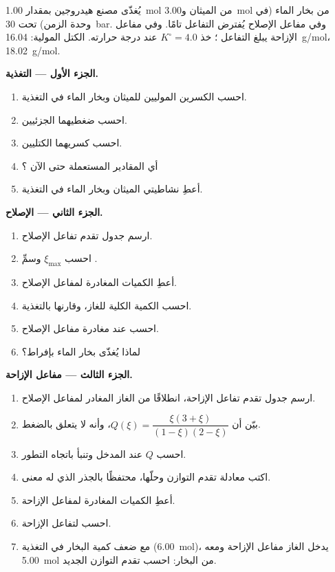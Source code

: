 \begin{problem}
\label{pb:b1:extent-q-and-k:1}
يُغذّى مصنع هيدروجين بمقدار \qty{1.00}{mol} من الميثان
و\qty{3.00}{mol} من بخار الماء (في وحدة الزمن) تحت \qty{30}{bar}. وفي
مفاعل الإصلاح يُفترض التفاعل  تامًا. وفي مفاعل
الإزاحة يبلغ التفاعل  ؛ خذ $K^\circ =
4.0$ عند درجة حرارته. الكتل المولية:  \qty{16.04}{g/mol}،
 \qty{18.02}{g/mol}.

\medskip
\noindent\textbf{الجزء الأول --- التغذية.}
\begin{enumerate}
  \item احسب الكسرين الموليين للميثان وبخار الماء في التغذية.
  \item احسب ضغطيهما الجزئيين.
  \item احسب كسريهما الكتليين.
  \item أي المقادير المستعملة حتى الآن ؟
  \item أعطِ نشاطيتي الميثان وبخار الماء في التغذية.
\end{enumerate}

\medskip
\noindent\textbf{الجزء الثاني --- الإصلاح.}
\begin{enumerate}[resume]
  \item ارسم جدول تقدم تفاعل الإصلاح.
  \item احسب $\xi_{\max}$ وسمِّ .
  \item أعطِ الكميات المغادرة لمفاعل الإصلاح.
  \item احسب الكمية الكلية للغاز، وقارنها بالتغذية.
  \item احسب  عند مغادرة مفاعل الإصلاح.
  \item لماذا يُغذّى بخار الماء بإفراط؟
\end{enumerate}

\medskip
\noindent\textbf{الجزء الثالث --- مفاعل الإزاحة.}
\begin{enumerate}[resume]
  \item ارسم جدول تقدم تفاعل الإزاحة، انطلاقًا من
        الغاز المغادر لمفاعل الإصلاح.
  \item بيّن أن $Q(\xi) = \dfrac{\xi(3 + \xi)}{(1 - \xi)(2 - \xi)}$،
        وأنه لا يتعلق بالضغط.
  \item احسب $Q$ عند المدخل وتنبأ باتجاه التطور.
  \item اكتب معادلة تقدم التوازن وحلّها،
        محتفظًا بالجذر الذي له معنى.
  \item أعطِ الكميات المغادرة لمفاعل الإزاحة.
  \item احسب  لتفاعل الإزاحة.
  \item مع ضعف كمية البخار في التغذية (\qty{6.00}{mol})، يدخل الغاز
        مفاعل الإزاحة ومعه \qty{5.00}{mol} من البخار: احسب
        تقدم التوازن الجديد.
\end{enumerate}


\end{problem}
